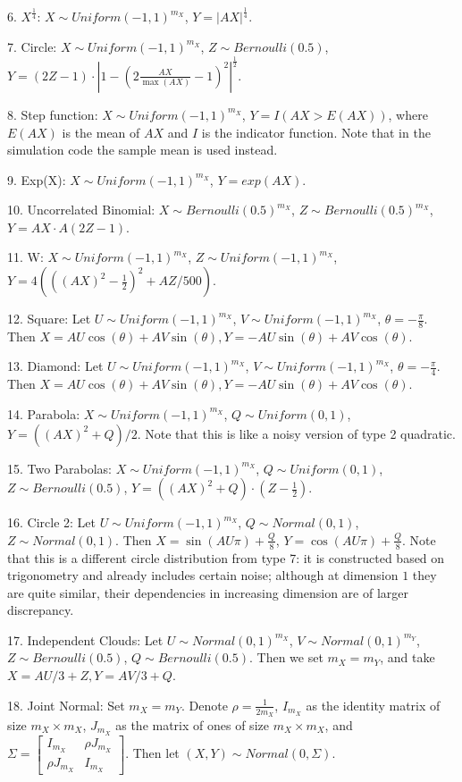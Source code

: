 \documentclass[12pt]{article}
\begin{document}
6. $X^\frac{1}{4}$: $X \sim Uniform(-1,1)^{m_{X}}$, $Y=|AX|^\frac{1}{4}$.

7. Circle: $X \sim Uniform(-1,1)^{m_{X}}$, $Z \sim Bernoulli(0.5)$, $Y=(2Z-1) \cdot |1-(2\frac{AX}{\max(AX)}-1)^2|^{\frac{1}{2}}$.

8. Step function: $X \sim Uniform(-1,1)^{m_{X}}$, $Y=I(AX>E(AX))$, where $E(AX)$ is the mean of $AX$ and $I$ is the indicator function. Note that in the simulation code the sample mean is used instead.

9. Exp(X): $X \sim Uniform(-1,1)^{m_{X}}$, $Y=exp(AX)$.

10. Uncorrelated Binomial: $X \sim Bernoulli(0.5)^{m_{X}}$, $Z \sim Bernoulli(0.5)^{m_{X}}$, $Y=AX \cdot A(2Z-1)$.

11. W: $X \sim Uniform(-1,1)^{m_{X}}$, $Z \sim Uniform(-1,1)^{m_{X}}$, $Y=4( ( (AX)^2 - \frac{1}{2} )^2 + AZ/500 )$.

12. Square: Let $U \sim Uniform(-1,1)^{m_{X}}$, $V \sim Uniform(-1,1)^{m_{X}}$, $\theta=-\frac{\pi}{8}$. Then $X=AU \cos(\theta) + AV \sin(\theta), Y=-AU \sin(\theta) + AV \cos(\theta)$.

13. Diamond: Let $U \sim Uniform(-1,1)^{m_{X}}$, $V \sim Uniform(-1,1)^{m_{X}}$, $\theta=-\frac{\pi}{4}$. Then $X=AU \cos(\theta) + AV \sin(\theta), Y=-AU \sin(\theta) + AV \cos(\theta)$.

14. Parabola: $X \sim Uniform(-1,1)^{m_{X}}$, $Q \sim Uniform(0,1)$, $Y=( (AX)^2  + Q)/2$. Note that this is like a noisy version of type 2 quadratic.

15. Two Parabolas: $X \sim Uniform(-1,1)^{m_{X}}$, $Q \sim Uniform(0,1)$, $Z \sim Bernoulli(0.5)$, $Y=( (AX)^2  + Q) \cdot (Z-\frac{1}{2})$.

16. Circle 2: Let $U \sim Uniform(-1,1)^{m_{X}}$, $Q \sim Normal(0,1)$, $Z \sim Normal(0,1)$. Then $X=\sin(AU \pi)+\frac{Q}{8}$, $Y=\cos(AU \pi)+\frac{Q}{8}$. Note that this is a different circle distribution from type 7: it is constructed based on trigonometry and already includes certain noise; although at dimension $1$ they are quite similar, their dependencies in increasing dimension are of larger discrepancy.

17. Independent Clouds: Let $U \sim Normal(0,1)^{m_{X}}$, $V \sim Normal(0,1)^{m_{Y}}$, $Z \sim Bernoulli(0.5)$, $Q \sim Bernoulli(0.5)$. Then we set $m_{X}=m_{Y}$, and take $X=AU/3+Z, Y=AV/3+Q$.

18. Joint Normal: Set $m_{X}=m_{Y}$. Denote $\rho=\frac{1}{2m_{X}}$, $I_{m_{X}}$ as the identity matrix of size $m_{X} \times m_{X}$, $J_{m_{X}}$ as the matrix of ones of size $m_{X} \times m_{X}$, and $\Sigma = \begin{bmatrix} I_{m_{X}}&\rho J_{m_{X}}\\ \rho J_{m_{X}}&I_{m_{X}} \end{bmatrix}$. Then let $(X,Y) \sim Normal(0, \Sigma)$.
\end{document}
